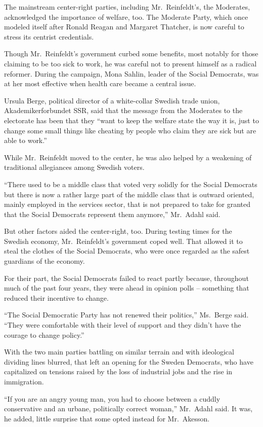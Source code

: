 ﻿\documentclass[12pt]{article}
\begin{document}
The mainstream center-right parties, including Mr.~Reinfeldt's, the Moderates, acknowledged the
importance of welfare, too. The Moderate Party, which once modeled itself after Ronald Reagan and
Margaret Thatcher, is now careful to stress its centrist credentials.

Though Mr.~Reinfeldt's government curbed some benefits, most notably for those claiming to be too
sick to work, he was careful not to present himself as a radical reformer. During the campaign, Mona
Sahlin, leader of the Social Democrats, was at her most effective when health care became a central
issue.

Ursula Berge, political director of a white-collar Swedish trade union, Akademikerforbundet SSR,
said that the message from the Moderates to the electorate has been that they ``want to keep the
welfare state the way it is, just to change some small things like cheating by people who claim they
are sick but are able to work.''

While Mr.~Reinfeldt moved to the center, he was also helped by a weakening of traditional
allegiances among Swedish voters.

``There used to be a middle class that voted very solidly for the Social Democrats but there is now
a rather large part of the middle class that is outward oriented, mainly employed in the services
sector, that is not prepared to take for granted that the Social Democrats represent them anymore,''
Mr.~Adahl said.

But other factors aided the center-right, too. During testing times for the Swedish economy,
Mr.~Reinfeldt's government coped well. That allowed it to steal the clothes of the Social Democrats,
who were once regarded as the safest guardians of the economy.

For their part, the Social Democrats failed to react partly because, throughout much of the past
four years, they were ahead in opinion polls -- something that reduced their incentive to change.

``The Social Democratic Party has not renewed their politics,'' Ms.~Berge said. ``They were
comfortable with their level of support and they didn't have the courage to change policy.''

With the two main parties battling on similar terrain and with ideological dividing lines blurred,
that left an opening for the Sweden Democrats, who have capitalized on tensions raised by the loss
of industrial jobs and the rise in immigration.

``If you are an angry young man, you had to choose between a cuddly conservative and an urbane,
politically correct woman,'' Mr.~Adahl said. It was, he added, little surprise that some opted
instead for Mr.~Akesson.
\end{document}
